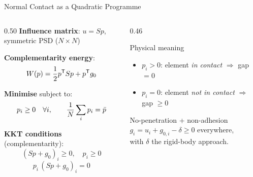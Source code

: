 \begin{frame}{Normal Contact as a Quadratic Programme}
\begin{columns}[T]
\begin{column}{0.50\textwidth}
  \textbf{Influence matrix}: $u = Sp$, symmetric PSD ($N\!\times\!N$)

  \textbf{Complementarity energy}:
  \[
    W(p) = \frac{1}{2}p^{\mathsf{T}} S p + p^{\mathsf{T}} g_0
  \]

  \textbf{Minimise} subject to:
  \[
    p_i \ge 0 \quad\forall i, \qquad
    \frac{1}{N}\sum_i p_i = \bar{p}
  \]

  \vspace{0.3em}
  \textbf{KKT conditions} (complementarity):
  \[
    (Sp+g_0)_i \ge 0,\quad p_i \ge 0
  \]
  \[
    p_i\,(Sp+g_0)_i = 0
  \]
\end{column}
\begin{column}{0.46\textwidth}
  \begin{block}{Physical meaning}
    \begin{itemize}
      \item $p_i > 0$: element \emph{in contact}
        $\Rightarrow$ gap $= 0$
      \item $p_i = 0$: element \emph{not in contact}
        $\Rightarrow$ gap $\ge 0$
    \end{itemize}
  \end{block}
  \vspace{0.4em}
  \begin{alertblock}{No-penetration + non-adhesion}
    $g_i = u_i + g_{0,i} - \delta \ge 0$ everywhere,\\
    with $\delta$ the rigid-body approach.
  \end{alertblock}
\end{column}
\end{columns}
\end{frame}

